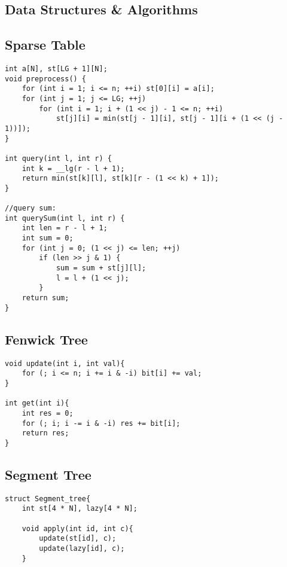 \documentclass[11pt,a4paper]{article}
\begin{document}
\setcounter{tocdepth}{2}
\begin{multicols}{2}
\tableofcontents
\end{multicols}
\newpage

\begin{multicols*}{2}

\section{Data Structures \& Algorithms}

\subsection{Sparse Table}
\begin{lstlisting}
int a[N], st[LG + 1][N];
void preprocess() {
    for (int i = 1; i <= n; ++i) st[0][i] = a[i];
    for (int j = 1; j <= LG; ++j)
        for (int i = 1; i + (1 << j) - 1 <= n; ++i)
            st[j][i] = min(st[j - 1][i], st[j - 1][i + (1 << (j - 1))]);
}

int query(int l, int r) {
    int k = __lg(r - l + 1);
    return min(st[k][l], st[k][r - (1 << k) + 1]);
}

//query sum:
int querySum(int l, int r) {
    int len = r - l + 1;
    int sum = 0;
    for (int j = 0; (1 << j) <= len; ++j)
        if (len >> j & 1) {
            sum = sum + st[j][l];
            l = l + (1 << j);
        }
    return sum;
}
\end{lstlisting}

\subsection{Fenwick Tree}
\begin{lstlisting}
void update(int i, int val){
    for (; i <= n; i += i & -i) bit[i] += val;
}

int get(int i){
    int res = 0;
    for (; i; i -= i & -i) res += bit[i];
    return res;
}
\end{lstlisting}

\subsection{Segment Tree}
\begin{lstlisting}
struct Segment_tree{
	int st[4 * N], lazy[4 * N];
	
    void apply(int id, int c){
        update(st[id], c);
        update(lazy[id], c);
    }


\end{lstlisting}
\end{multicols*}
\end{document}

